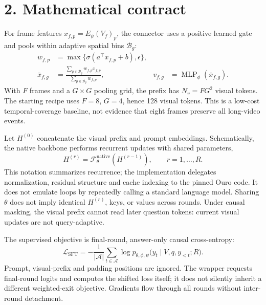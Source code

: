 \documentclass[10pt]{article}
\begin{document}
\clearpage
\section*{2. Mathematical contract}
For frame features $x_{f,p}=E_{\psi}(V_f)_p$, the connector uses a positive learned gate and pools within adaptive spatial bins $\mathcal B_g$:
\begin{align}
w_{f,p} &= \max\{\sigma(a^\top x_{f,p}+b),\epsilon\},\\
\bar x_{f,g} &= \frac{\sum_{p\in\mathcal B_g} w_{f,p}x_{f,p}}
                         {\sum_{p\in\mathcal B_g}w_{f,p}},
&v_{f,g}&=\operatorname{MLP}_{\phi}(\bar x_{f,g}).
\end{align}
With $F$ frames and a $G\times G$ pooling grid, the prefix has $N_v=FG^2$ visual tokens. The starting recipe uses $F=8$, $G=4$, hence 128 visual tokens. This is a low-cost temporal-coverage baseline, not evidence that eight frames preserve all long-video events.

Let $H^{(0)}$ concatenate the visual prefix and prompt embeddings. Schematically, the native backbone performs recurrent updates with shared parameters,
\begin{equation}
H^{(r)}=\mathcal F_{\theta}^{\mathrm{native}}(H^{(r-1)}),
\qquad r=1,\ldots,R.
\end{equation}
This notation summarizes recurrence; the implementation delegates normalization, residual structure and cache indexing to the pinned Ouro code. It does not emulate loops by repeatedly calling a standard language model. Sharing $\theta$ does not imply identical $H^{(r)}$, keys, or values across rounds. Under causal masking, the visual prefix cannot read later question tokens: current visual updates are not query-adaptive.

The supervised objective is final-round, answer-only causal cross-entropy:
\begin{equation}
\mathcal L_{\mathrm{SFT}}=-\frac{1}{|\mathcal A|}
\sum_{t\in\mathcal A}\log p_{\theta,\phi,\psi}
\big(y_t\mid V,q,y_{<t};R\big).
\end{equation}
Prompt, visual-prefix and padding positions are ignored. The wrapper requests final-round logits and computes the shifted loss itself; it does not silently inherit a different weighted-exit objective. Gradients flow through all rounds without inter-round detachment.
\end{document}
